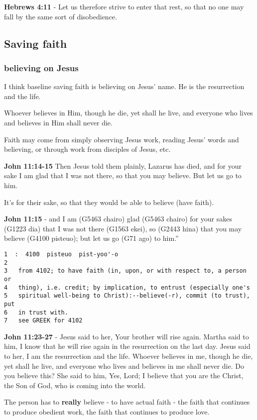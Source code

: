 \documentclass[11pt]{article}
\begin{document}
\textbf{Hebrews 4:11} - Let us therefore strive to enter that rest, so that no one may fall by the same sort of disobedience.

\subsection{Saving faith}
\label{sec:org9cf8ab0}
\subsubsection{believing on Jesus}
\label{sec:org6075396}
I think baseline saving faith is believing on Jesus' name. He is the resurrection and the life.

Whoever believes in Him, though he die, yet shall he live, and everyone who lives and believes in Him shall never die.

Faith may come from simply observing Jesus work, reading Jesus' words and believing, or through work from disciples of Jesus, etc.

\textbf{John 11:14-15} Then Jesus told them plainly, Lazarus has died, and for your sake I am glad that I was not there, so that you may believe. But let us go to him.

It's for their sake, so that they would be able to believe (have faith).

\textbf{John 11:15} - and I am (G5463 chairo) glad (G5463 chairo) for your sakes (G1223 dia) that I was not there (G1563 ekei), so (G2443 hina) that you may believe (G4100 pisteuo); but let us go (G71 ago) to him.”

\begin{verbatim}
1  :  4100  pisteuo  pist-yoo'-o
2  
3   from 4102; to have faith (in, upon, or with respect to, a person or
4   thing), i.e. credit; by implication, to entrust (especially one's
5   spiritual well-being to Christ):--believe(-r), commit (to trust), put
6   in trust with.
7   see GREEK for 4102
\end{verbatim}

\textbf{John 11:23-27} - Jesus said to her, Your brother will rise again.  Martha said to him, I know that he will rise again in the resurrection on the last day.  Jesus said to her, I am the resurrection and the life. Whoever believes in me, though he die, yet shall he live, and everyone who lives and believes in me shall never die. Do you believe this?  She said to him, Yes, Lord; I believe that you are the Christ, the Son of God, who is coming into the world.

The person has to \textbf{really} believe - to have actual faith - the faith that continues to produce obedient work, the faith that continues to produce love.
\end{document}
